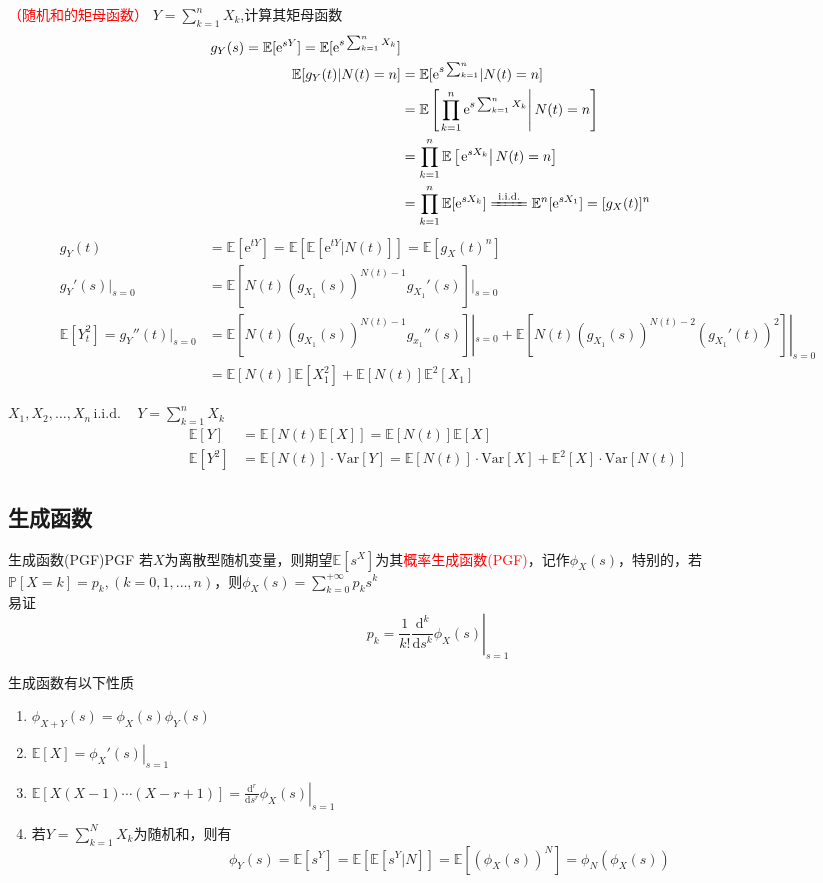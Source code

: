 \documentclass{elegantbook}
\newcommand\iid{\,\text{i.i.d.}\,}
\newcommand\var{\text{Var}}
\newcommand\p{\mathbb{P}}
\newcommand\e{\mathrm{e}}
\newcommand\E{\mathbb{E}}
\begin{document}
\begin{example}
    \textcolor{red}{（随机和的矩母函数）} $Y=\sum_{k=1}^{n}X_k$,计算其矩母函数
    \[\begin{aligned}
        g_Y(s)=\E [\e ^{sY}]=\E [\e ^{s\sum_{k=1}^{n}X_k}]\\
        \E [g_Y(t)|N(t)=n]&=\E [\e ^{s\sum_{k=1}^{n}}|N(t)=n]\\
        &=\E \left[\left.\prod_{k=1}^{n}\e ^{s\sum_{k=1}^{n}X_k}\right|N(t)=n\right]\\
        &=\prod_{k=1}^{n}\E \left[\left.\e ^{sX_k}\right|N(t)=n\right]\\
        &=\prod_{k=1}^{n}\E [\e ^{sX_k}]\xlongequal{\iid}\E ^n[\e ^{sX_1}]=[g_X(t)]^n
    \end{aligned}\]
    \[\begin{aligned}
        g_Y(t)&=\E [\e ^{tY}]=\E [\E [\e ^{tY}|N(t)]]=\E [g_X(t)^n]\\
        g_Y'(s)|_{s=0}&=\E [N(t)\left(g_{X_1}(s)\right)^{N(t)-1}g_{X_1}'(s)]|_{s=0}\\
        \E [Y_t^2]=g_Y''(t)|_{s=0}&=\E [N(t)(g_{X_1}(s))^{N(t)-1}g_{x_1}''(s)]|_{s=0}+\E [N(t)(g_{X_1}(s))^{N(t)-2}(g_{X_1}'(t))^2]|_{s=0}\\
        &=\E [N(t)]\E [X_1^2]+\E [N(t)]\E ^2[X_1]
    \end{aligned}\]
\end{example}
\begin{remark}
    $X_1,X_2,\dots ,X_n\iid \quad Y=\sum_{k=1}^{n}X_k$
    \[\begin{aligned}
        \E [Y]&=\E [N(t)\E [X]]=\E [N(t)]\E [X]\\
        \E [Y^2]&=\E [N(t)]\cdot \var [Y]=\E [N(t)]\cdot \var [X]+\E ^2[X]\cdot \var [N(t)]
    \end{aligned}\]
\end{remark}

\subsection{生成函数}
\begin{definition}{生成函数(PGF)}{PGF}
    若$X$为离散型随机变量，则期望$\E [s^X]$为其\textcolor{red}{概率生成函数(PGF)}，记作$\phi _X(s)$，特别的，若$\p [X=k]=p_k,(k=0,1,\dots ,n)$，则$\phi _X(s)=\sum_{k=0}^{+\infty}p_ks^k$
    \\ 易证\[p_k=\left.\frac{1}{k!}\frac{\mathrm{d}^k}{\mathrm{d}s^k}\phi _X(s)\right|_{s=1}\]
\end{definition}
\begin{remark}
    生成函数有以下性质
    \begin{enumerate}
        \item $\phi _{X+Y}(s)=\phi _X(s)\phi _Y(s)$
        \item $\E [X]=\left.\phi _X'(s)\right|_{s=1}$
        \item $\E [X(X-1)\cdots (X-r+1)]=\left.\frac{\mathrm{d}^r}{\mathrm{d}s^r}\phi _X(s)\right|_{s=1}$
        \item 若$Y=\sum_{k=1}^{N}X_k$为随机和，则有\[\phi _Y(s)=\E [s^Y]=\E [\E [s^Y|N]]=\E [(\phi _X(s))^N]=\phi _N(\phi _X(s))\]
    \end{enumerate}
\end{remark}
\end{document}
